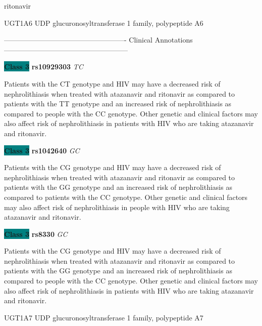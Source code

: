 \documentclass{resume} %
\begin{document}
\begin{rSection}{ ritonavir }
\begin{rSubsection}{ UGT1A6 }{ UDP glucuronosyltransferase 1 family, polypeptide A6 }{}{}
\item[] ---------------------------------------------------- Clinical Annotations -----------------------------------------------------\newline
\item \textbf{\colorbox{teal} {Class 3}} \textbf{ rs10929303 } \textit{ TC }
\item[] Patients with the CT genotype and HIV may have a decreased risk of nephrolithiasis when treated with atazanavir and ritonavir as compared to patients with the TT genotype and an increased risk of nephrolithiasis as compared to people with the CC genotype. Other genetic and clinical factors may also affect risk of nephrolithiasis in patients with HIV who are taking atazanavir and ritonavir. \item \textbf{\colorbox{teal} {Class 3}} \textbf{ rs1042640 } \textit{ GC }
\item[] Patients with the CG genotype and HIV may have a decreased risk of nephrolithiasis when treated with atazanavir and ritonavir as compared to patients with the GG genotype and an increased risk of nephrolithiasis as compared to patients with the CC genotype. Other genetic and clinical factors may also affect risk of nephrolithiasis in people with HIV who are taking atazanavir and ritonavir.\item \textbf{\colorbox{teal} {Class 3}} \textbf{ rs8330 } \textit{ GC }
\item[] Patients with the CG genotype and HIV may have a decreased risk of nephrolithiasis when treated with atazanavir and ritonavir as compared to patients with the GG genotype and an increased risk of nephrolithiasis as compared to people with the CC genotype. Other genetic and clinical factors may also affect risk of nephrolithiasis in patients with HIV who are taking atazanavir and ritonavir.
\end{rSubsection}\begin{rSubsection}{ UGT1A7 }{ UDP glucuronosyltransferase 1 family, polypeptide A7 }{}{}
\item[]


\end{rSubsection}
\end{rSection}
\end{document}
